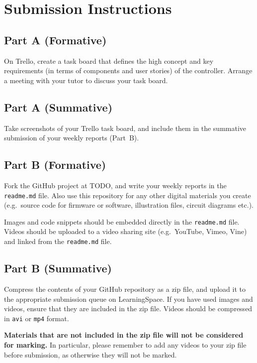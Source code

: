 \documentclass{../fal_assignment}
\begin{document}
\section*{Submission Instructions}

\subsection*{Part A (Formative)}

On Trello, create a task board that defines the high concept and key requirements (in terms of components and user stories) of the controller. Arrange a meeting with your tutor to discuss your task board.

\subsection*{Part A (Summative)}

Take screenshots of your Trello task board, and include them in the summative submission
of your weekly reports (Part~B).

\subsection*{Part B (Formative)}

Fork the GitHub project at TODO, and write your weekly reports in the \texttt{readme.md} file.
Also use this repository for any other digital materials you create
(e.g.\ source code for firmware or software, illustration files, circuit diagrams etc.).

Images and code snippets should be embedded directly in the \texttt{readme.md} file.
Videos should be uploaded to a video sharing site (e.g.\ YouTube, Vimeo, Vine)
and linked from the \texttt{readme.md} file.

\subsection*{Part B (Summative)}

Compress the contents of your GitHub repository as a zip file,
and upload it to the appropriate submission queue on LearningSpace.
If you have used images and videos, ensure that they are included in the zip file.
Videos should be compressed in \texttt{avi} or \texttt{mp4} format.

\textbf{Materials that are not included in the zip file will not be considered for marking.}
In particular, please remember to add any videos to your zip file before submission,
as otherwise they will not be marked.
\end{document}
